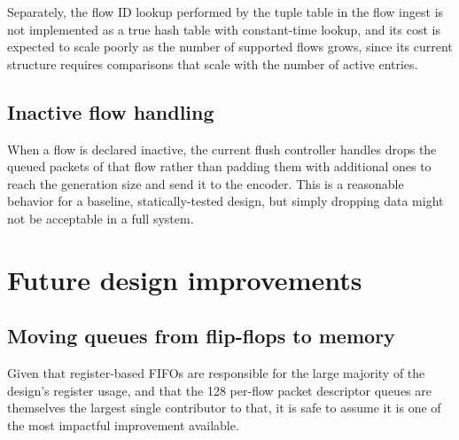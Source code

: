 Separately, the flow ID lookup performed by the tuple table in the flow ingest
 is not implemented as a true hash table with constant-time
lookup, and its cost is expected to scale poorly as the number of supported flows grows, since
its current structure requires comparisons that scale with the number of active entries.

\subsection{Inactive flow handling}

When a flow is declared inactive, the current flush controller handles drops the queued packets of 
that flow rather than padding them with additional ones to reach the generation 
size and send it to the encoder. This is a reasonable behavior for a baseline,
statically-tested design, but simply dropping data might not be acceptable in a full system.

\section{Future design improvements}

\subsection{Moving queues from flip-flops to memory}

Given that register-based FIFOs are responsible for the large majority of the design's register
usage, and that the 128 per-flow packet descriptor queues are themselves the largest single
contributor to that, it is safe to assume it is one of the most impactful improvement available. \\

